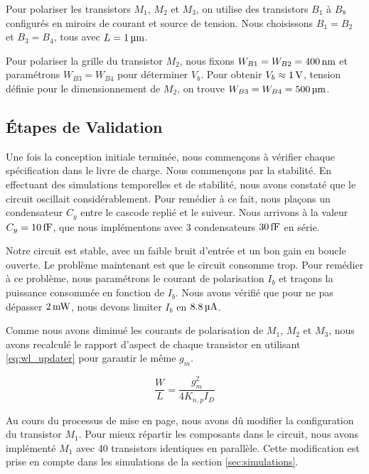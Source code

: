 \documentclass[a4paper,12pt]{article}
\numberwithin{equation}{section}
\newcommand{\?}{\stackrel{?}{=}}
\newcommand{\sis}[2]{\complexnum{#1}\,\si[per-mode=symbol]{#2}}
\begin{document}
Pour polariser les transistors $M_1$, $M_2$ et $M_3$, on utilise des transistors $B_1$ à $B_8$ configurés en miroirs de courant et source de tension. Nous choisissons $B_1=B_2$ et $B_3=B_4$, tous avec $L=\sis{1}{\micro\meter}$.

Pour polariser la grille du transistor $M_2$, nous fixons $W_{B1}=W_{B2}=\sis{400}{\nano\meter}$ et paramétrons $W_{B3}=W_{B4}$ pour déterminer $ V_b$. Pour obtenir $V_b\approx\sis{1}{\volt}$, tension définie pour le dimensionnement de $M_2$, on trouve $W_{B3}=W_{B4}=\sis{500}{\micro\meter}$.

\subsection{Étapes de Validation}

Une fois la conception initiale terminée, nous commençons à vérifier chaque spécification dans le livre de charge. Nous commençons par la stabilité. En effectuant des simulations temporelles et de stabilité, nous avons constaté que le circuit oscillait considérablement. Pour remédier à ce fait, nous plaçons un condensateur $C_y$ entre le cascode replié et le suiveur. Nous arrivons à la valeur $C_y=\sis{10}{\femto\farad}$, que nous implémentons avec 3 condensateurs $\sis{30}{\femto\farad}$ en série.

Notre circuit est stable, avec un faible bruit d'entrée et un bon gain en boucle ouverte. Le problème maintenant est que le circuit consomme trop. Pour remédier à ce problème, nous paramétrons le courant de polarisation $I_b$ et traçons la puissance consommée en fonction de $I_b$. Nous avons vérifié que pour ne pas dépasser $\sis{2}{\milli\watt}$, nous devons limiter $I_b$ en $\sis{8.8}{\micro\ampere}$.

Comme nous avons diminué les courants de polarisation de $M_1$, $M_2$ et $M_3$, nous avons recalculé le rapport d'aspect de chaque transistor en utilisant \eqref{eq:wl_updater} pour garantir le même $g_m$.

\begin{equation}\label{eq:wl_updater}
    \frac{W}{L}=\frac{g_m^2}{4K_{n,p}I_D}
\end{equation}

Au cours du processus de mise en page, nous avons dû modifier la configuration du transistor $M_1$. Pour mieux répartir les composants dans le circuit, nous avons implémenté $M_1$ avec 40 transistors identiques en parallèle. Cette modification est prise en compte dans les simulations de la section \ref{sec:simulations}.
\end{document}
